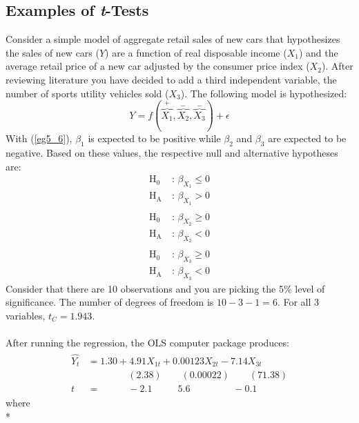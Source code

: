 \documentclass[11pt]{article}
\begin{document}
\subsection{Examples of \textit{t}-Tests}
Consider a simple model of aggregate retail sales of new cars that hypothesizes the sales of new cars ($Y$) are a function of real disposable income ($X_1$) and the average retail price of a new car adjusted by the consumer price index ($X_2$). After reviewing literature you have decided to add a third independent variable, the number of sports utility vehicles sold ($X_3$). The following model is hypothesized:
\begin{equation}
\label{eg5_6}Y = f(\overbrace{X_1}^+, \overbrace{X_2}^-, \overbrace{X_3}^-) + \epsilon
\end{equation}
With (\ref{eg5_6}), $\beta_1$ is expected to be positive while $\beta_2$ and $\beta_3$ are expected to be negative. Based on these values, the respective null and alternative hypotheses are:
\begin{align*}
\text{H}_0 & \text{: }\beta_{X_1} \leq 0 \\ \text{H}_\text{A} & \text{: } \beta_{X_1} > 0\\ \\
\text{H}_0 & \text{: }\beta_{X_2} \geq 0 \\ \text{H}_\text{A} & \text{: } \beta_{X_2} < 0\\ \\
\text{H}_0 & \text{: }\beta_{X_3} \geq 0 \\ \text{H}_\text{A}\ & \text{: } \beta_{X_3} < 0
\end{align*}
Consider that there are 10 observations and you are picking the 5\% level of significance. The number of degrees of freedom is $10-3-1=6$. For all 3 variables, $t_C = 1.943$.\\ \\
After running the regression, the OLS computer package produces:
\begin{align}
\label{eg5_7}
\begin{split}
\hat{Y_t} &= 1.30+4.91X_{1t}+0.00123X_{2t}-7.14X_{3t}\\
&\>\>\>\>\>\>\>\>\>\>\>\>\>\>\>\>\>\>\> (2.38) \>\>\>\>\>\>\>\>\> (0.00022)
\>\>\>\>\>\>\>\>\>(71.38)\\
t&=\>\>\>\>\>\>\>\>\>\>\>\>\> -2.1 
\>\>\>\>\>\>\>\>\>\>\>\> 5.6
\>\>\>\>\>\>\>\>\>\>\>\>\>\>\>\>\>\>\>\>-0.1
\end{split}
\end{align}
where\\*
\end{document}
